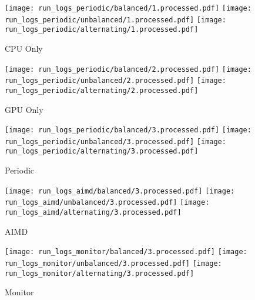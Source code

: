 \documentclass{article}
\begin{document}


\begin{landscape}
\begin{figure}
\centering
\texttt{[image: run\_logs\_periodic/balanced/1.processed.pdf]}
\texttt{[image: run\_logs\_periodic/unbalanced/1.processed.pdf]}
\texttt{[image: run\_logs\_periodic/alternating/1.processed.pdf]} 
\vspace{-.5cm}
\caption{CPU Only}

\texttt{[image: run\_logs\_periodic/balanced/2.processed.pdf]}
\texttt{[image: run\_logs\_periodic/unbalanced/2.processed.pdf]}
\texttt{[image: run\_logs\_periodic/alternating/2.processed.pdf]} 
\vspace{-.5cm}
\caption{GPU Only}

\texttt{[image: run\_logs\_periodic/balanced/3.processed.pdf]}
\texttt{[image: run\_logs\_periodic/unbalanced/3.processed.pdf]}
\texttt{[image: run\_logs\_periodic/alternating/3.processed.pdf]} 
\vspace{-.5cm}
\caption{Periodic}

\texttt{[image: run\_logs\_aimd/balanced/3.processed.pdf]}
\texttt{[image: run\_logs\_aimd/unbalanced/3.processed.pdf]}
\texttt{[image: run\_logs\_aimd/alternating/3.processed.pdf]} 
\vspace{-.5cm}
\caption{AIMD}

\texttt{[image: run\_logs\_monitor/balanced/3.processed.pdf]}
\texttt{[image: run\_logs\_monitor/unbalanced/3.processed.pdf]}
\texttt{[image: run\_logs\_monitor/alternating/3.processed.pdf]} 
\vspace{-.5cm}
\caption{Monitor}

\end{figure}
\end{landscape}
\end{document}

